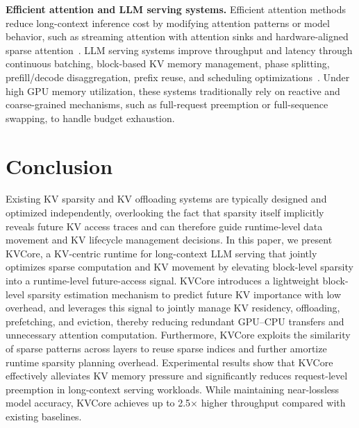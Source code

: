 \documentclass[sigplan,10pt,review,anonymous]{acmart}
\begin{document}
\noindent\textbf{Efficient attention and LLM serving systems.}
Efficient attention methods reduce long-context inference cost by modifying attention patterns or model behavior, such as streaming attention with attention sinks and hardware-aligned sparse attention~\cite{xiao2024efficient,yuan2025native}.
LLM serving systems improve throughput and latency through continuous batching, block-based KV memory management, phase splitting, prefill/decode disaggregation, prefix reuse, and scheduling optimizations~\cite{kwon2023efficient,yu2022orca,agrawal2024taming,gim2024prompt,juravsky2024hydragen,jin2024p,patel2024splitwise}.
Under high GPU memory utilization, these systems traditionally rely on reactive and coarse-grained mechanisms, such as full-request preemption or full-sequence swapping, to handle budget exhaustion.



\section{Conclusion}
\label{sec:conclusion}
Existing KV sparsity and KV offloading systems are typically designed and optimized independently, overlooking the fact that sparsity itself implicitly reveals future KV access traces and can therefore guide runtime-level data movement and KV lifecycle management decisions. In this paper, we present KVCore, a KV-centric runtime for long-context LLM serving that jointly optimizes sparse computation and KV movement by elevating block-level sparsity into a runtime-level future-access signal.
KVCore introduces a lightweight block-level sparsity estimation mechanism to predict future KV importance with low overhead, and leverages this signal to jointly manage KV residency, offloading, prefetching, and eviction, thereby reducing redundant GPU–CPU transfers and unnecessary attention computation. Furthermore, KVCore exploits the similarity of sparse patterns across layers to reuse sparse indices and further amortize runtime sparsity planning overhead.
Experimental results show that KVCore effectively alleviates KV memory pressure and significantly reduces request-level preemption in long-context serving workloads. While maintaining near-lossless model accuracy, KVCore achieves up to 2.5× higher throughput compared with existing baselines.







\end{document}
